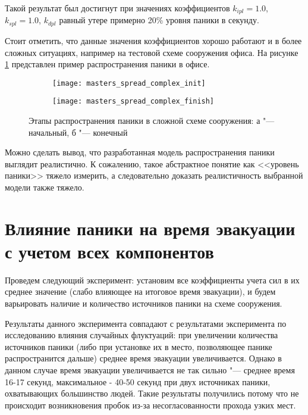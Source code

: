 Такой результат был достигнут при значениях коэффициентов $k_{ipl} = 1.0$, $k_{spl} = 1.0$, $k_{dpl}$ равный утере примерно 20\% уровня паники в секунду.

Стоит отметить, что данные значения коэффициентов хорошо работают и в более сложных ситуациях, например на тестовой схеме сооружения офиса.
На рисунке \ref{sec:results:panic_spread:office} представлен пример распространения паники в офисе.

\begin{figure}[ht!]
  \centering
  \begin{subfigure}[!htb]{1.0\textwidth}
    \centering
    \texttt{[image: masters\_spread\_complex\_init]}
    \caption{}
  \end{subfigure}
  \begin{subfigure}[!htb]{1.0\textwidth}
    \centering
    \texttt{[image: masters\_spread\_complex\_finish]}
    \caption{}
  \end{subfigure}
  \caption{Этапы распространения паники в сложной схеме сооружения: а "--- начальный, б "--- конечный}
  \label{sec:results:panic_spread:office}
\end{figure}

Можно сделать вывод, что разработанная модель распространения паники выглядит реалистично.
К сожалению, такое абстрактное понятие как <<уровень паники>> тяжело измерить,
а следовательно доказать реалистичность выбранной модели также тяжело.

\section{Влияние паники на время эвакуации с учетом всех компонентов}
\label{sec:results:general}

Проведем следующий эксперимент: установим все коэффициенты учета сил в их среднее значение
(слабо влияющее на итоговое время эвакуации), и будем варьировать наличие и количество источников паники
на схеме сооружения.

Результаты данного эксперимента совпадают с результатами эксперимента по исследованию влияния случайных флуктуаций:
при увеличении количества источников паники (либо при установке их в место, позволяющее панике распространится дальше)
среднее время эвакуации увеличивается.
Однако в данном случае время эвакуации увеличивается не так сильно "---
среднее время 16-17 секунд, максимальное - 40-50 секунд при двух источниках паники, охватывающих большинство людей.
Такие результаты получились потому что не происходит возникновения пробок из-за несогласованности прохода узких мест.

